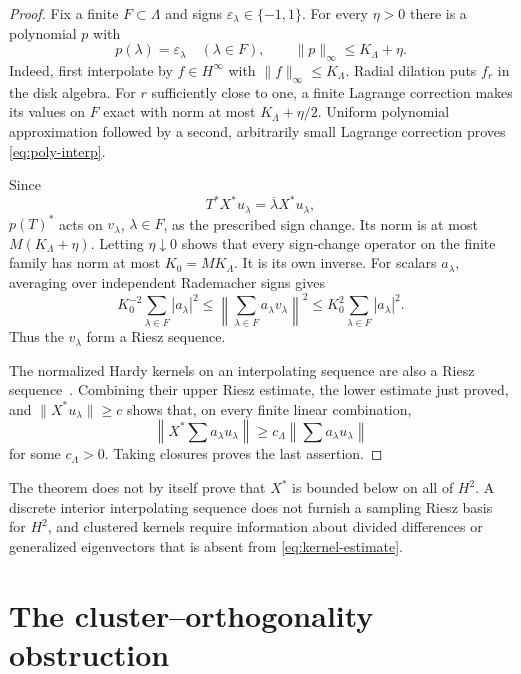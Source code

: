 \documentclass[11pt]{article}
\newcommand{\Htwo}{H^2}
\begin{document}
\begin{proof}
Fix a finite $F\subset\Lambda$ and signs
$\varepsilon_\lambda\in\{-1,1\}$.  For every $\eta>0$ there is a polynomial
$p$ with
\begin{equation}\label{eq:poly-interp}
 p(\lambda)=\varepsilon_\lambda\quad(\lambda\in F),
 \qquad \|p\|_\infty\leq K_\Lambda+\eta.
\end{equation}
Indeed, first interpolate by $f\in H^\infty$ with
$\|f\|_\infty\leq K_\Lambda$.  Radial dilation puts $f_r$ in the disk
algebra.  For $r$ sufficiently close to one, a finite Lagrange correction
makes its values on $F$ exact with norm at most $K_\Lambda+\eta/2$.
Uniform polynomial approximation followed by a second, arbitrarily small
Lagrange correction proves \eqref{eq:poly-interp}.

Since
\[
 T^*X^*u_\lambda=\overline\lambda X^*u_\lambda,
\]
$p(T)^*$ acts on $v_\lambda$, $\lambda\in F$, as the prescribed sign
change.  Its norm is at most $M(K_\Lambda+\eta)$.  Letting $\eta\downarrow0$
shows that every sign-change operator on the finite family has norm at most
$K_0=MK_\Lambda$.  It is its own inverse.  For scalars $a_\lambda$, averaging
over independent Rademacher signs gives
\[
 K_0^{-2}\sum_{\lambda\in F}|a_\lambda|^2
 \leq\left\|\sum_{\lambda\in F}a_\lambda v_\lambda\right\|^2
 \leq K_0^2\sum_{\lambda\in F}|a_\lambda|^2.
\]
Thus the $v_\lambda$ form a Riesz sequence.

The normalized Hardy kernels on an interpolating sequence are also a Riesz
sequence~\cite{Nikolski}.  Combining their upper Riesz estimate, the lower
estimate just proved, and $\|X^*u_\lambda\|\geq c$ shows that, on every finite
linear combination,
\[
 \left\|X^*\sum a_\lambda u_\lambda\right\|
 \geq c_\Lambda\left\|\sum a_\lambda u_\lambda\right\|
\]
for some $c_\Lambda>0$.  Taking closures proves the last assertion.
\end{proof}

The theorem does not by itself prove that $X^*$ is bounded below on all of
$\Htwo$.  A discrete interior interpolating sequence does not furnish a
sampling Riesz basis for $\Htwo$, and clustered kernels require information
about divided differences or generalized eigenvectors that is absent from
\eqref{eq:kernel-estimate}.

\section{The cluster--orthogonality obstruction}
\end{document}
